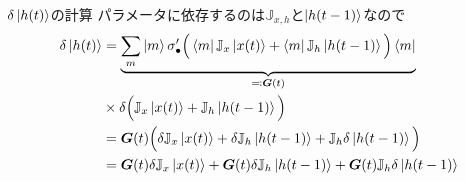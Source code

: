\documentclass[dvipdfmx,10pt]{beamer}
\begin{document}
  \begin{frame}[label=計算1]{$\delta\ket{h(t)}$の計算}
    パラメータに依存するのは$\mathbb{J}_{x,h}$と$\ket{h(t-1)}$なので
    \begin{align*}
      \delta \ket{h(t)} &= \underbrace{\sum_{m}\ket{m}\sigma'_{\bullet}\Big(\bra{m}\mathbb{J}_{x}\ket{x(t)} + \bra{m}\mathbb{J}_{h}\ket{h(t-1)}\Big)\bra{m}}_{\eqcolon \bm{G}(t)}\\
      &\times \delta \Big(\mathbb{J}_x\ket{x(t)} + \mathbb{J}_{h}\ket{h(t-1)}\Big)\\
      &= \bm{G}(t)\Big( \delta \mathbb{J}_x \ket{x(t)} + \delta \mathbb{J}_{h}\ket{h(t-1)} + \mathbb{J}_{h}\delta\ket{h(t-1)} \Big)\\
      &= \bm{G}(t)\delta \mathbb{J}_x \ket{x(t)} + \bm{G}(t)\delta\mathbb{J}_h\ket{h(t-1)} + \bm{G}(t)\mathbb{J}_h \delta \ket{h(t-1)}
    \end{align*}
  \end{frame}
\end{document}
